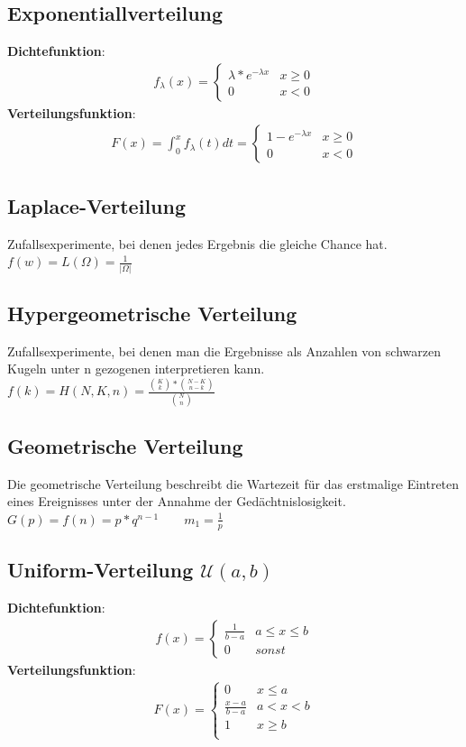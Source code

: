 \documentclass{article}
\begin{document}
\subsection{Exponentiallverteilung}
\textbf{Dichtefunktion}:
\begin{align} f_\lambda(x) =
	\begin{cases}
		\lambda*e^{-\lambda x} & x \geq 0 \\
		0                                     & x <    0
	\end{cases}
\end{align}
\textbf{Verteilungsfunktion}:
\begin{align} F(x) = \int_0^x f_\lambda(t) dt =
	\begin{cases}
		1 - e^{-\lambda x} & x \geq 0 \\
		0                                     & x <    0
	\end{cases}
\end{align}
\subsection{Laplace-Verteilung}
Zufallsexperimente, bei denen jedes Ergebnis die gleiche Chance hat. \\
$f(w) = L(\Omega) = \frac{1}{|\Omega|}$
\subsection{Hypergeometrische Verteilung}
Zufallsexperimente, bei denen man die Ergebnisse als Anzahlen von schwarzen Kugeln unter 	n gezogenen interpretieren kann. \\
$f(k) = H(N, K, n) = \frac{\binom{K}{k}*\binom{N-K}{n-k}}{\binom{N}{n}}$
\subsection{Geometrische Verteilung}
Die geometrische Verteilung beschreibt die Wartezeit für das erstmalige Eintreten
eines Ereignisses unter der Annahme der Ged\"achtnislosigkeit. \\
$G(p) = f(n) = p*q^{n-1} \quad \quad m_1 = \frac{1}{p}$
\subsection{Uniform-Verteilung $\mathcal{U}(a,b)$}
\textbf{Dichtefunktion}:
\begin{align} f(x) =
	\begin{cases}
		\frac{1}{b - a} & a \leq x \leq b \\
		0               &  sonst
	\end{cases}
\end{align}
\textbf{Verteilungsfunktion}:
\begin{align} F(x) =
	\begin{cases}
		0     & x \leq a\\
		\frac{x - a}{b - a} & a < x < b \\
		1     & x \geq b\\
	\end{cases}
\end{align}
\end{document}
